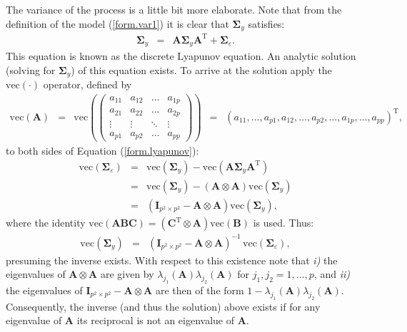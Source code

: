 \documentclass[a4paper]{article}
\theoremstyle{myexamplestyle}
\begin{document}
The variance of the process is a little bit more elaborate. Note that from the definition of the model (\ref{form.var1}) it is clear that $\mathbf{\Sigma}_{y}$ satisfies:
\begin{eqnarray} \label{form.lyapunov}
\mathbf{\Sigma}_{y} & = & \mathbf{A} \mathbf{\Sigma}_{y} \mathbf{A}^{\mathrm{T}} + \mathbf{\Sigma}_{\varepsilon}.
\end{eqnarray}
This equation is known as the discrete Lyapunov equation. An analytic solution (solving for $\mathbf{\Sigma}_{y}$) of this equation exists. To arrive at the solution
apply the $\mbox{vec}(\cdot)$ operator, defined by
\begin{eqnarray*}
\mbox{vec}(\mathbf{A})
& = & \mbox{vec} \left( \left(
\begin{array}{cccc}
a_{11} & a_{12} & \ldots & a_{1p}
\\
a_{21} & a_{22} & \ldots & a_{2p}
\\
\vdots & \vdots & \ddots & \vdots
\\
a_{p1} & a_{p2} & \ldots & a_{pp}
\end{array}
\right) \right)
\, \, \, = \, \, \,
(a_{11}, \ldots, a_{p1}, a_{12}, \ldots, a_{p2}, \ldots, a_{1p}, \ldots, a_{pp})^{\mathrm{T}},
\end{eqnarray*}
to both sides of Equation (\ref{form.lyapunov}):
\begin{eqnarray*}
\mbox{vec}(\mathbf{\Sigma}_{\varepsilon}) & = &
\mbox{vec}(\mathbf{\Sigma}_{y}) - \mbox{vec}(\mathbf{A} \mathbf{\Sigma}_{y} \mathbf{A}^{\mathrm{T}})
\\
& = &
\mbox{vec}(\mathbf{\Sigma}_{y}) - (\mathbf{A} \otimes \mathbf{A} )
\mbox{vec}(\mathbf{\Sigma}_{y})
\\
& = & (\mathbf{I}_{p^2 \times p^2} - \mathbf{A} \otimes \mathbf{A} )
\mbox{vec}(\mathbf{\Sigma}_{y}),
\end{eqnarray*}
where the identity $\mbox{vec}( \mathbf{A} \mathbf{B} \mathbf{C}) = (\mathbf{C}^{\mathrm{T}} \otimes \mathbf{A}) \mbox{vec}( \mathbf{B})$ is used. Thus:
\begin{eqnarray*}
\mbox{vec}(\mathbf{\Sigma}_{y}) & = & (\mathbf{I}_{p^2 \times p^2} - \mathbf{A} \otimes \mathbf{A} )^{-1} \, \mbox{vec}(\mathbf{\Sigma}_{\varepsilon}),
\end{eqnarray*}
presuming the inverse exists. With respect to this existence note that {\it i)} the eigenvalues of $\mathbf{A} \otimes \mathbf{A}$ are given by $\lambda_{j_1}(\mathbf{A}) \lambda_{j_2}(\mathbf{A})$ for $j_1, j_2=1,\ldots,p$, and {\it ii)} the eigenvalues of $\mathbf{I}_{p^2 \times p^2} - \mathbf{A} \otimes \mathbf{A}$ are then of the form $1 - \lambda_{j_1}(\mathbf{A}) \lambda_{j_2}(\mathbf{A})$. Consequently, the inverse (and thus the solution) above exists if for any eigenvalue of $\mathbf{A}$ its reciprocal is not an eigenvalue of $\mathbf{A}$.
\end{document}

